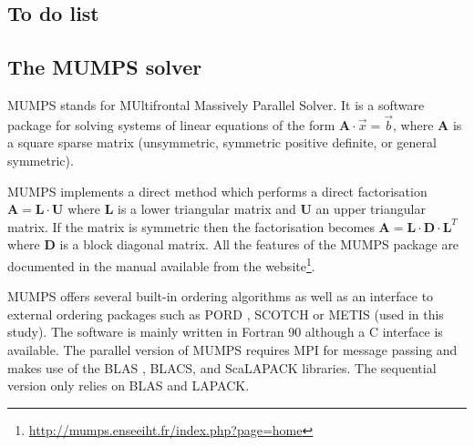 \subsection{To do list}



\subsection{The MUMPS solver}

MUMPS stands for MUltifrontal Massively Parallel Solver. It is a software package 
for solving systems of linear equations of the 
form ${\bm A}\cdot{\vec x} = {\vec b}$, where ${\bm A}$ is a square sparse matrix (unsymmetric, 
symmetric positive definite, or general symmetric). 

MUMPS implements a direct method which performs a direct factorisation
${\bm A} = {\bm L}\cdot{\bm U}$ where ${\bm L}$ is a lower triangular matrix and ${\bm U}$ 
an upper triangular matrix. If the matrix is symmetric then the factorisation becomes
${\bm A} = {\bm L}\cdot{\bm D}\cdot{\bm L}^T$
where ${\bm D}$ is a block diagonal matrix. 
All the features of the MUMPS package are documented in the manual available from the 
website\footnote{\url{http://mumps.enseeiht.fr/index.php?page=home}}.


MUMPS offers several built-in ordering algorithms as well as an 
interface to external ordering packages such as PORD \cite{schu01}, SCOTCH \cite{pell07} 
or METIS \cite{kaku98} (used in this study). 
The software is mainly written in Fortran 90 although a C interface is available. 
The parallel version of MUMPS requires 
MPI \cite{snoh96} for message passing and makes use of the BLAS \cite{dodd90a,dodd90b}, BLACS, and ScaLAPACK
\cite{blcc97} libraries. 
The sequential version only relies on BLAS and LAPACK.

